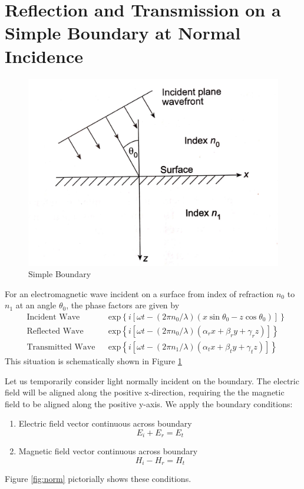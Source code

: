 \documentclass{article}
\begin{document}
\section{Reflection and Transmission on a Simple Boundary at Normal Incidence}
    \begin{figure}
        \includegraphics[width=\linewidth]{simple_boundary.png}
        \caption{Simple Boundary}
        \label{fig:simp}
    \end{figure}
    For an electromagnetic wave incident on a surface from index of refraction $n_0$ to $n_1$ at an angle $\theta_0$, the phase factors are given by
    \begin{align}
        &\text{Incident Wave} & &\mathrm{exp}\left\{ i [\omega t - (2\pi n_0 / \lambda)(x \sin \theta_0 - z \cos \theta_0)]\right\} \\
        &\text{Reflected Wave} & &\mathrm{exp}\left\{ i [\omega t - (2\pi n_0 / \lambda)(\alpha_r x + \beta_r y + \gamma_r z)]\right\} \\
        &\text{Transmitted Wave} & &\mathrm{exp}\left\{ i [\omega t - (2\pi n_1 / \lambda)(\alpha_t x + \beta_t y + \gamma_t z)]\right\}
    \end{align}
    This situation is schematically shown in Figure \ref{fig:simp}

    Let us temporarily consider light normally incident on the boundary. The electric field will be aligned along the positive x-direction, requiring the the magnetic field to be aligned along the positive y-axis. We apply the boundary conditions:
    \begin{enumerate}
        \item Electric field vector continuous across boundary
        \begin{equation}
            E_i + E_r = E_t
        \end{equation} 
        \item Magnetic field vector continuous across boundary
        \begin{equation}
            H_i - H_r = H_t
            \label{eq:magcont}
        \end{equation}
    \end{enumerate}
    Figure \ref{fig:norm} pictorially shows these conditions.
\end{document}
